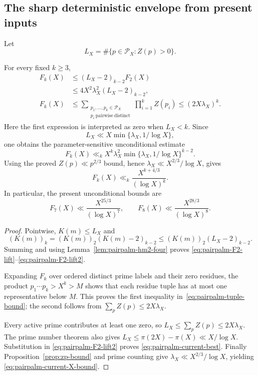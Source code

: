 \subsection*{The sharp deterministic envelope from present inputs}

Let
\[
 L_X=\#\{p\in\mathcal P_X:Z(p)>0\}.
\]

\begin{proposition}
\label{prop:pairpalm-unconditional-envelope}
For every fixed $k\geq3$,
\begin{align}
 F_k(X)
 &\leq(L_X-2)_{k-2}F_2(X)                              \label{eq:pairpalm-F2-lift}\\
 &\leq4X^2\lambda_X^2(L_X-2)_{k-2},                    \label{eq:pairpalm-F2-lift2}\\
 F_k(X)
 &\leq
 \sum_{\substack{p_1,\ldots,p_k\in\mathcal P_X\\
                   p_i\ \mathrm{pairwise\ distinct}}}
 \prod_{i=1}^k Z(p_i)
 \leq(2X\lambda_X)^k.                                 \label{eq:pairpalm-tuple-bound}
\end{align}
Here the first expression is interpreted as zero when $L_X<k$.
Since
\[
 L_X\ll X\min\{\lambda_X,1/\log X\},
\]
one obtains the parameter-sensitive unconditional estimate
\begin{equation}\label{eq:pairpalm-current-best}
 \boxed{
 F_k(X)\ll_k
 X^k\lambda_X^2
 \min\{\lambda_X,1/\log X\}^{k-2}.}
\end{equation}
Using the proved $Z(p)\ll p^{2/3}$ bound, hence
$\lambda_X\ll X^{2/3}/\log X$, gives
\begin{equation}\label{eq:pairpalm-current-X-bound}
 F_k(X)\ll_k\frac{X^{k+4/3}}{(\log X)^k}.
\end{equation}
In particular, the present unconditional bounds are
\[
 F_7(X)\ll\frac{X^{25/3}}{(\log X)^7},
 \qquad
 F_8(X)\ll\frac{X^{28/3}}{(\log X)^8}.
\]
\end{proposition}

\begin{proof}
Pointwise, $K(m)\leq L_X$ and
\[
 (K(m))_k=(K(m))_2(K(m)-2)_{k-2}
 \leq(K(m))_2(L_X-2)_{k-2}.
\]
Summing and using Lemma~\ref{lem:pairpalm-hm2-four} proves
\eqref{eq:pairpalm-F2-lift}--\eqref{eq:pairpalm-F2-lift2}.

Expanding $F_k$ over ordered distinct prime labels and their zero
residues, the product $p_1\cdots p_k>X^k>M$ shows that each residue
tuple has at most one representative below $M$.  This proves the first
inequality in~\eqref{eq:pairpalm-tuple-bound}; the second follows from
$\sum_pZ(p)\leq2X\lambda_X$.

Every active prime contributes at least one zero, so
$L_X\leq\sum_pZ(p)\leq2X\lambda_X$.  The prime number theorem also gives
$L_X\leq\pi(2X)-\pi(X)\ll X/\log X$.  Substitution in
\eqref{eq:pairpalm-F2-lift2} proves
\eqref{eq:pairpalm-current-best}.  Finally
Proposition~\ref{prop:zp-bound} and prime counting give
$\lambda_X\ll X^{2/3}/\log X$, yielding
\eqref{eq:pairpalm-current-X-bound}.
\end{proof}

